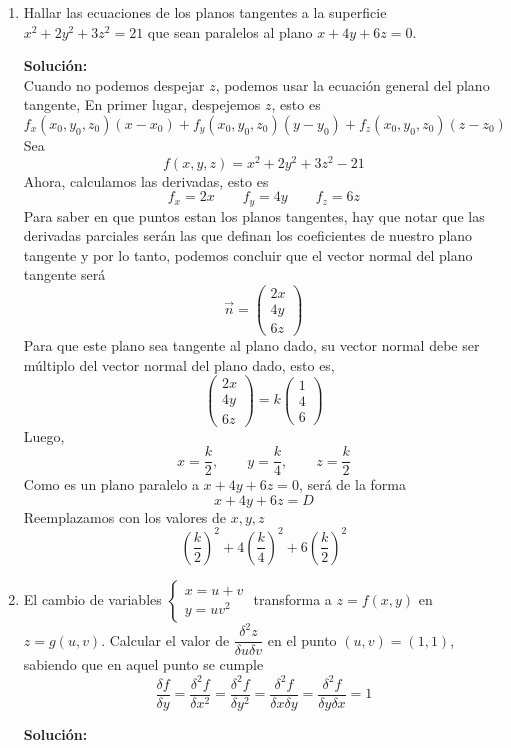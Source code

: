 \documentclass[12pt]{article}
\newenvironment{solucion}
{\begin{mdframed}[backgroundcolor=black!10]
		{\bf Solución:}\\
	}
	{
	\end{mdframed}
}
\newenvironment{preguntas}
{\begin{enumerate}\itemsep12pt
	}
	{
	\end{enumerate}
}
\newcommand{\ra}{\rightarrow}
\begin{document}
\begin{preguntas}
\begin{solucion}
Recordemos que el plano tangente viene dado por
$$z - z_0 = f_x(x_0, y_0)(x-x_0) + f_y(x_0,y_0)(y-y_0)$$
Notemos que
$$f_x(x,y) = -\dfrac{1}{2}y\sin\left(\dfrac{x}{2}\right) \qquad f(\pi, 1) = -\dfrac{1}{2}$$
$$f_y(x,y) = \cos\left(\dfrac{x}{2}\right) \qquad f(\pi, 1) = 0$$
Luego,
$$z = -\dfrac{1}{2}(x-\pi) \ra 2z + x = \pi$$
Donde $\Pi: 2z + x = \pi$ corresponde al plano tangente.
\end{solucion}
\item Hallar las ecuaciones de los planos tangentes a la superficie $x^2 + 2y^2 + 3z^2 = 21$ que sean paralelos al plano $x + 4y + 6z = 0$.
\begin{solucion}
Cuando no podemos despejar $z$, podemos usar la ecuación general del plano tangente,
En primer lugar, despejemos $z$, esto es
$$f_x(x_0,y_0,z_0)(x-x_0) +f_y(x_0,y_0,z_0)(y-y_0) + f_z(x_0,y_0,z_0)(z-z_0)$$
Sea 
$$f(x,y,z) = x^2 + 2y^2 + 3z^2 -21$$
Ahora, calculamos las derivadas, esto es
$$f_x = 2x \qquad f_y = 4y \qquad f_z = 6z$$
Para saber en que puntos estan los planos tangentes, hay que notar que las derivadas parciales serán las que definan los coeficientes de nuestro plano tangente y por lo tanto, podemos concluir que el vector normal del plano tangente será
$$\vec{n} = \begin{pmatrix}2x \\ 4y\\ 6z\end{pmatrix}$$
Para que este plano sea tangente al plano dado, su vector normal debe ser múltiplo del vector normal del plano dado, esto es,
$$\begin{pmatrix}2x \\ 4y\\ 6z\end{pmatrix} = k \begin{pmatrix}1 \\ 4\\ 6\end{pmatrix}$$
Luego,
$$x = \dfrac{k}{2}, \qquad y = \dfrac{k}{4}, \qquad z = \dfrac{k}{2}$$
Como es un plano paralelo a $x + 4y + 6z = 0$, será de la forma
$$x + 4y + 6z = D$$
Reemplazamos con los valores de $x,y,z$
$$\left(\dfrac{k}{2}\right)^2 + 4\left(\dfrac{k}{4}\right)^2 + 6\left(\dfrac{k}{2}\right)^2$$
\end{solucion}
\item El cambio de variables 
	$\begin{cases}
	x=u+v\\
	y=uv^2
	\end{cases}$
	transforma a $z=f(x,y)$ en $z=g(u,v)$. Calcular el valor de $\dfrac{\delta^2z}{\delta u \delta v}$ en el punto $(u,v) = (1,1)$, sabiendo que en aquel punto se cumple$$\dfrac{\delta f}			{\delta y} = \dfrac{\delta^2 f}{\delta x^2}=\dfrac{\delta^2 f}{\delta y^2}=\dfrac{\delta^2 f}{\delta x \delta y}=\dfrac{\delta^2 f}{\delta y \delta x}=1$$
\begin{solucion}

\end{solucion}
\end{preguntas}
\end{document}
